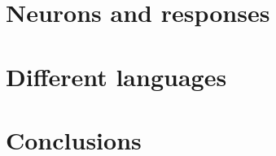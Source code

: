 
\section{Neurons and responses}
\label{sec:brain:neurons}


\section{Different languages}
\label{sec:brain:codes}

\section{Conclusions}
